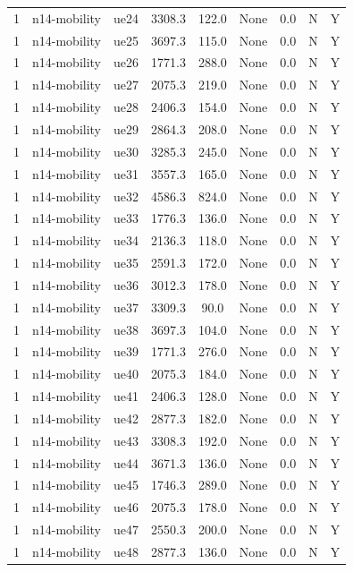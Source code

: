 \begin{table}[ht]
\begin{tabular}{|c|c|c|c|c|c|c|c|c|}
1 & n14-mobility & ue24 & 3308.3 & 122.0 & None & 0.0 & N & Y \\
1 & n14-mobility & ue25 & 3697.3 & 115.0 & None & 0.0 & N & Y \\
1 & n14-mobility & ue26 & 1771.3 & 288.0 & None & 0.0 & N & Y \\
1 & n14-mobility & ue27 & 2075.3 & 219.0 & None & 0.0 & N & Y \\
1 & n14-mobility & ue28 & 2406.3 & 154.0 & None & 0.0 & N & Y \\
1 & n14-mobility & ue29 & 2864.3 & 208.0 & None & 0.0 & N & Y \\
1 & n14-mobility & ue30 & 3285.3 & 245.0 & None & 0.0 & N & Y \\
1 & n14-mobility & ue31 & 3557.3 & 165.0 & None & 0.0 & N & Y \\
1 & n14-mobility & ue32 & 4586.3 & 824.0 & None & 0.0 & N & Y \\
1 & n14-mobility & ue33 & 1776.3 & 136.0 & None & 0.0 & N & Y \\
1 & n14-mobility & ue34 & 2136.3 & 118.0 & None & 0.0 & N & Y \\
1 & n14-mobility & ue35 & 2591.3 & 172.0 & None & 0.0 & N & Y \\
1 & n14-mobility & ue36 & 3012.3 & 178.0 & None & 0.0 & N & Y \\
1 & n14-mobility & ue37 & 3309.3 & 90.0 & None & 0.0 & N & Y \\
1 & n14-mobility & ue38 & 3697.3 & 104.0 & None & 0.0 & N & Y \\
1 & n14-mobility & ue39 & 1771.3 & 276.0 & None & 0.0 & N & Y \\
1 & n14-mobility & ue40 & 2075.3 & 184.0 & None & 0.0 & N & Y \\
1 & n14-mobility & ue41 & 2406.3 & 128.0 & None & 0.0 & N & Y \\
1 & n14-mobility & ue42 & 2877.3 & 182.0 & None & 0.0 & N & Y \\
1 & n14-mobility & ue43 & 3308.3 & 192.0 & None & 0.0 & N & Y \\
1 & n14-mobility & ue44 & 3671.3 & 136.0 & None & 0.0 & N & Y \\
1 & n14-mobility & ue45 & 1746.3 & 289.0 & None & 0.0 & N & Y \\
1 & n14-mobility & ue46 & 2075.3 & 178.0 & None & 0.0 & N & Y \\
1 & n14-mobility & ue47 & 2550.3 & 200.0 & None & 0.0 & N & Y \\
1 & n14-mobility & ue48 & 2877.3 & 136.0 & None & 0.0 & N & Y \\

\end{tabular}
\end{table}
